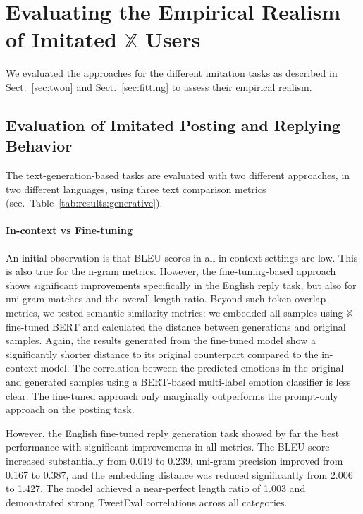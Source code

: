 \section{Evaluating the Empirical Realism of Imitated $\mathbb{X}$ Users}
We evaluated the approaches for the different imitation tasks as described in Sect.~\ref{sec:twon} and Sect.~\ref{sec:fitting} to assess their empirical realism.



\subsection{Evaluation of Imitated Posting and Replying Behavior}
The text-generation-based tasks are evaluated with two different approaches, in two different languages, using three text comparison metrics (see.~Table~\ref{tab:results:generative}).

\paragraph{In-context vs Fine-tuning}
An initial observation is that BLEU scores \cite{papineni2002bleu} in all in-context settings are low. This is also true for the n-gram metrics. However, the fine-tuning-based approach shows significant improvements specifically in the English reply task, but also for uni-gram matches and the overall length ratio. Beyond such token-overlap-metrics, we tested semantic similarity metrics: we embedded all samples using $\mathbb{X}$-fine-tuned BERT \citep{zhang2023twhin} and calculated the distance between generations and original samples. Again, the results generated from the fine-tuned model show a significantly shorter distance to its original counterpart compared to the in-context model. The correlation between the predicted emotions in the original and generated samples using a BERT-based multi-label emotion classifier \citep{barbieri2020tweeteval} is less clear. The fine-tuned approach only marginally outperforms the prompt-only approach on the posting task. 

However, the English fine-tuned reply generation task showed by far the best performance with significant improvements in all metrics. The BLEU score increased substantially from 0.019 to 0.239, uni-gram precision improved from 0.167 to 0.387, and the embedding distance was reduced significantly from 2.006 to 1.427. The model achieved a near-perfect length ratio of 1.003 and demonstrated strong TweetEval correlations across all categories.

